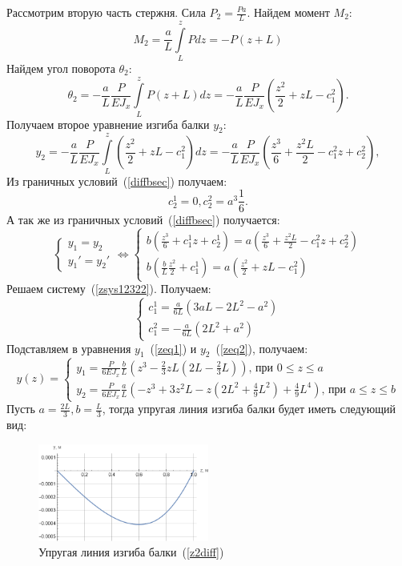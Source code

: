 \documentclass[12pt, a4paper]{article}
\begin{document}
Рассмотрим вторую часть стержня. Сила $P_2 = \frac{P a}{L}$. 
Найдем момент $M_2$:
\[
		M_2 = \frac{a}{L} \int\limits_L^z P d z = -P(z + L)
\]
Найдем угол поворота $\theta_2$:
\[
		\theta_2 = - \frac{a}{L} \frac{P}{E J_{x}} \int\limits_L^z P(z + L) d z = - \frac{a}{L} \frac{P}{E J_{x}} \left(\frac{z^2}{2} + z L - c_1^2\right). 
\]
Получаем второе уравнение изгиба балки $y_2$: 
\begin{equation}
	\label{zeq2}
	y_2 =  - \frac{a}{L} \frac{P}{E J_{x}} \int\limits_L^z \left(\frac{z^2}{2} + z L - c_1^2\right) dz = - \frac{a}{L}  \frac{P}{E J_{x}} \left(\frac{z^3}{6} + \frac{z^2 L}{2} - c_1^2 z + c_2^2\right),
\end{equation}
Из граничных условий~(\ref{diffbsec}) получаем:
\[
	c_2^1 = 0,
	c_2^2 = a^3 \frac{1}{6}.
\]
А так же из граничных условий~(\ref{diffbsec}) получается:
\begin{equation}
	\label{zsys12322}
	\begin{cases}
		y_1 = y_2\\
		y_1' = y_2'
	\end{cases}
\Leftrightarrow
	\begin{cases}
	{b} \left(\frac{z^3}{6} + c_1^1 z + c_2^1\right) = {a}\left(\frac{z^3}{6} + \frac{z^2 L}{2} - c_1^2 z + c_2^2\right)\\
	b\left(\frac{b}{L} \frac{z^2}{2} + c_1^1\right) = a\left(\frac{z^2}{2} + z L - c_1^2\right)
	\end{cases}
\end{equation}
Решаем систему~(\ref{zsys12322}). Получаем:
\[
	\begin{cases}
		c_1^1 = \frac{a}{6 L} (3 a L - 2 L^2 - a^2)\\
		c_1^2 = -\frac{a}{6 L} (2 L^2 + a^2)
	\end{cases}
\]
Подставляем в уравнения $y_1$~(\ref{zeq1}) и $y_2$~(\ref{zeq2}), получаем:
\begin{equation}
	\label{z2diff}
	y(z) = 
	\begin{cases}
		y_1 = \frac{P}{6 E J_{x}} \frac{b}{L} \left(z^3 - \frac{2}{3} z L\left(2 L - \frac{2}{3}L\right)\right)\mbox{, при } 0 \leqslant z \leqslant a\\
		y_2 = \frac{P}{6 E J_{x}} \frac{a}{L} \left(-z^3 + 3 z^2 L - z\left(2 L^2 + \frac{4}{9} L^2\right) + \frac{4}{9}L^4\right)\mbox{, при } a \leqslant z \leqslant b
	\end{cases}
\end{equation}
Пусть $a = \frac{2 L}{3}, b = \frac{L}{3}$, тогда упругая линия изгиба балки будет иметь следующий вид:
\begin{figure}[!h]
	\centering
	\includegraphics[width=0.5\textwidth]{g.2}%
	\caption{Упругая линия изгиба балки~(\ref{z2diff})}
	\vspace*{-2mm}
	\label{g2}
\end{figure}
\end{document}
